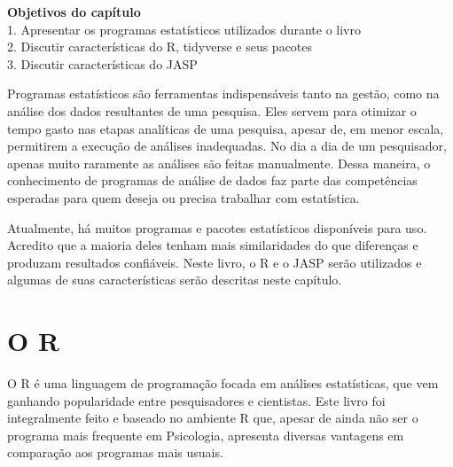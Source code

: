 \documentclass[
]{book}
\begin{document}
\begin{objectives}
\textbf{Objetivos do capítulo}\\
1. Apresentar os programas estatísticos utilizados durante o livro\\
2. Discutir características do R, tidyverse e seus pacotes\\
3. Discutir características do JASP
\end{objectives}

Programas estatísticos são ferramentas indispensáveis tanto na gestão, como na análise dos dados resultantes de uma pesquisa. Eles servem para otimizar o tempo gasto nas etapas analíticas de uma pesquisa, apesar de, em menor escala, permitirem a execução de análises inadequadas. No dia a dia de um pesquisador, apenas muito raramente as análises são feitas manualmente. Dessa maneira, o conhecimento de programas de análise de dados faz parte das competências esperadas para quem deseja ou precisa trabalhar com estatística.

Atualmente, há muitos programas e pacotes estatísticos disponíveis para uso. Acredito que a maioria deles tenham mais similaridades do que diferenças e produzam resultados confiáveis. Neste livro, o R e o JASP serão utilizados e algumas de suas características serão descritas neste capítulo.

\hypertarget{o-r}{%
\section{O R}\label{o-r}}

O R é uma linguagem de programação focada em análises estatísticas, que vem ganhando popularidade entre pesquisadores e cientistas. Este livro foi integralmente feito e baseado no ambiente R que, apesar de ainda não ser o programa mais frequente em Psicologia, apresenta diversas vantagens em comparação aos programas mais usuais.
\end{document}
